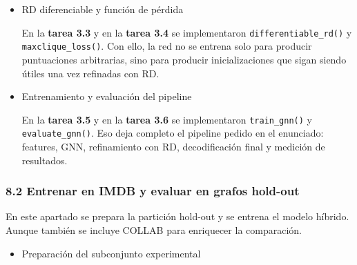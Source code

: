 \documentclass[11pt]{article}
\providecommand{\tightlist}{%
      \setlength{\itemsep}{0pt}\setlength{\parskip}{0pt}}
\begin{document}
    \begin{itemize}
\item
  RD diferenciable y función de pérdida

  En la \textbf{tarea 3.3} y en la \textbf{tarea 3.4} se implementaron
  \texttt{differentiable\_rd()} y \texttt{maxclique\_loss()}. Con ello,
  la red no se entrena solo para producir puntuaciones arbitrarias, sino
  para producir inicializaciones que sigan siendo útiles una vez
  refinadas con RD.
\end{itemize}

    \begin{itemize}
\item
  Entrenamiento y evaluación del pipeline

  En la \textbf{tarea 3.5} y en la \textbf{tarea 3.6} se implementaron
  \texttt{train\_gnn()} y \texttt{evaluate\_gnn()}. Eso deja completo el
  pipeline pedido en el enunciado: features, GNN, refinamiento con RD,
  decodificación final y medición de resultados.
\end{itemize}

    \subsubsection{8.2 Entrenar en IMDB y evaluar en grafos
hold-out}\label{entrenar-en-imdb-y-evaluar-en-grafos-hold-out}

En este apartado se prepara la partición hold-out y se entrena el modelo
híbrido. Aunque también se incluye COLLAB para enriquecer la
comparación.

    \begin{itemize}
\tightlist
\item
  Preparación del subconjunto experimental
\end{itemize}
\end{document}
